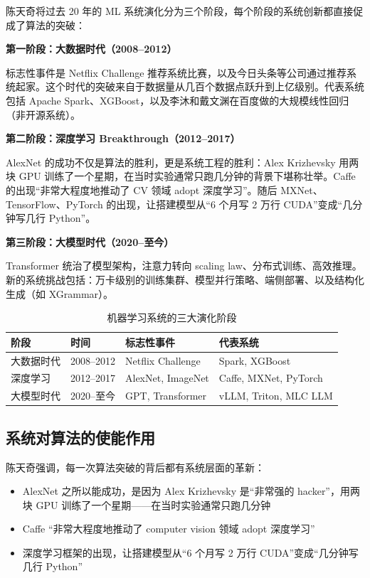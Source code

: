 \documentclass[a4paper]{article}
\begin{document}
陈天奇将过去 20 年的 ML 系统演化分为三个阶段，每个阶段的系统创新都直接促成了算法的突破：

\textbf{第一阶段：大数据时代（2008--2012）}

标志性事件是 Netflix Challenge 推荐系统比赛，以及今日头条等公司通过推荐系统起家。这个时代的突破来自于数据量从几百个数据点跃升到上亿级别。代表系统包括 Apache Spark、XGBoost，以及李沐和戴文渊在百度做的大规模线性回归（非开源系统）。

\textbf{第二阶段：深度学习 Breakthrough（2012--2017）}

AlexNet 的成功不仅是算法的胜利，更是系统工程的胜利：Alex Krizhevsky 用两块 GPU 训练了一个星期，在当时实验通常只跑几分钟的背景下堪称壮举。Caffe 的出现``非常大程度地推动了 CV 领域 adopt 深度学习''。随后 MXNet、TensorFlow、PyTorch 的出现，让搭建模型从``6 个月写 2 万行 CUDA''变成``几分钟写几行 Python''。

\textbf{第三阶段：大模型时代（2020--至今）}

Transformer 统治了模型架构，注意力转向 scaling law、分布式训练、高效推理。新的系统挑战包括：万卡级别的训练集群、模型并行策略、端侧部署、以及结构化生成（如 XGrammar）。

\begin{table}[H]
\centering
\begin{tabular}{p{2.5cm}p{3cm}p{3cm}p{4cm}}
\toprule
\textbf{阶段} & \textbf{时间} & \textbf{标志性事件} & \textbf{代表系统} \\
\midrule
大数据时代 & 2008--2012 & Netflix Challenge & Spark, XGBoost \\
深度学习 & 2012--2017 & AlexNet, ImageNet & Caffe, MXNet, PyTorch \\
大模型时代 & 2020--至今 & GPT, Transformer & vLLM, Triton, MLC LLM \\
\bottomrule
\end{tabular}
\caption{机器学习系统的三大演化阶段}
\end{table}

\subsection{系统对算法的使能作用}

陈天奇强调，每一次算法突破的背后都有系统层面的革新：

\begin{itemize}
    \item AlexNet 之所以能成功，是因为 Alex Krizhevsky 是``非常强的 hacker''，用两块 GPU 训练了一个星期------在当时实验通常只跑几分钟
    \item Caffe ``非常大程度地推动了 computer vision 领域 adopt 深度学习''
    \item 深度学习框架的出现，让搭建模型从``6 个月写 2 万行 CUDA''变成``几分钟写几行 Python''
\end{itemize}
\end{document}
